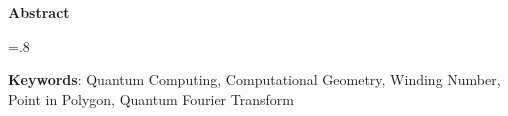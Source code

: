 


\pagestyle{empty}

\begin{latin}

\begin{center}
\textbf{Abstract}
\end{center}
\baselineskip=.8\baselineskip


\bigskip\noindent\textbf{Keywords}:
Quantum Computing, Computational Geometry, Winding Number, Point in Polygon, Quantum Fourier Transform

\end{latin}

\newpage
